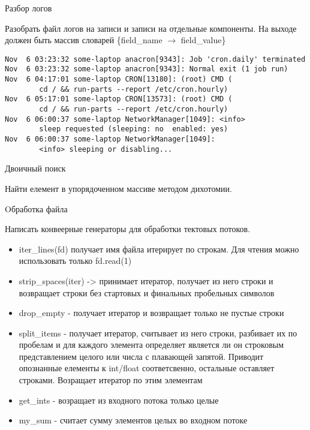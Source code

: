 \documentclass{article}
\begin{document}
\begin{center} Разбор логов \end{center}
Разобрать файл логов на записи и записи на отдельные компоненты.
На выходе должен быть массив словарей \{field\_name $\rightarrow$ field\_value\}
\begin{Large}
\begin{lstlisting}
Nov  6 03:23:32 some-laptop anacron[9343]: Job 'cron.daily' terminated
Nov  6 03:23:32 some-laptop anacron[9343]: Normal exit (1 job run)
Nov  6 04:17:01 some-laptop CRON[13180]: (root) CMD (
        cd / && run-parts --report /etc/cron.hourly)
Nov  6 05:17:01 some-laptop CRON[13573]: (root) CMD (
        cd / && run-parts --report /etc/cron.hourly)
Nov  6 06:00:37 some-laptop NetworkManager[1049]: <info>
        sleep requested (sleeping: no  enabled: yes)
Nov  6 06:00:37 some-laptop NetworkManager[1049]:
        <info> sleeping or disabling...
\end{lstlisting}
\end{Large}
\newpage

\begin{center} Двоичный поиск \end{center}
Найти елемент в упорядоченном массиве методом дихотомии.
\newpage

\begin{center} Oбработка файла \end{center}
Написать конвеерные генераторы для обработки тектовых потоков.
\begin{itemize}
    \item iter\_lines(fd) получает имя файла итерирует по строкам.
           Для чтения можно использовать только fd.read(1)
    \item strip\_spaces(iter) -> принимает итератор, получает из него
          строки и возвращает строки без стартовых и финальных пробельных символов
    \item drop\_empty - получает итератор и возвращает только не пустые строки
    \item split\_items - получает итератор, считывает из него строки,
          разбивает их по пробелам и для каждого элемента определяет является ли он
          строковым представлением целого или числа с плавающей запятой.
          Приводит опознанные елементы к int/float соответсвенно, остальные оставляет
          строками. Возращает итератор по этим элементам
    \item get\_ints - возращает из входного потока только целые
    \item my\_sum - считает сумму элементов целых во входном потоке
\end{itemize}
\end{document}
